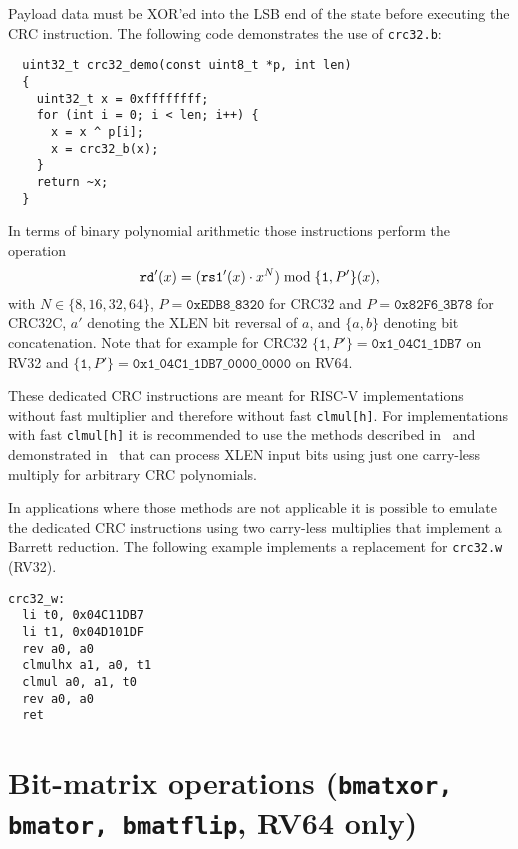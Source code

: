 

Payload data must be XOR'ed into the LSB end of the state before executing the
CRC instruction. The following code demonstrates the use of \texttt{crc32.b}:

\begin{minipage}{\linewidth}
\begin{verbatim}
  uint32_t crc32_demo(const uint8_t *p, int len)
  {
    uint32_t x = 0xffffffff;
    for (int i = 0; i < len; i++) {
      x = x ^ p[i];
      x = crc32_b(x);
    }
    return ~x;
  }
\end{verbatim}
\end{minipage}

In terms of binary polynomial arithmetic those instructions perform the operation
$$ \texttt{rd}'(x) = (\texttt{rs1}'(x) \cdot x^N) \; \textrm{mod} \; \{\texttt{1}, P'\}(x)\textrm, $$
with $N \in \{8, 16, 32, 64\}$,
$P = \texttt{0xEDB8\_8320}$ for CRC32 and $P = \texttt{0x82F6\_3B78}$ for CRC32C,
$a'$ denoting the XLEN bit reversal of $a$,
and $\{a, b\}$ denoting bit concatenation.
Note that for example for CRC32 $\{\texttt{1}, P'\} = \texttt{0x1\_04C1\_1DB7}$
on RV32 and $\{\texttt{1}, P'\} = \texttt{0x1\_04C1\_1DB7\_0000\_0000}$ on RV64.

These dedicated CRC instructions are meant for RISC-V implementations without fast multiplier
and therefore without fast \texttt{clmul[h]}. For implementations with fast \texttt{clmul[h]}
it is recommended to use the methods described in~\cite{FastCRC} and demonstrated in~\cite{Wolf18A}
that can process XLEN input bits using just one carry-less multiply for arbitrary CRC polynomials.

In applications where those methods are not applicable it is possible to emulate the dedicated CRC
instructions using two carry-less multiplies that implement a Barrett reduction. The following example
implements a replacement for \texttt{crc32.w} (RV32).

\begin{minipage}{\linewidth}
\begin{verbatim}
crc32_w:
  li t0, 0x04C11DB7
  li t1, 0x04D101DF
  rev a0, a0
  clmulhx a1, a0, t1
  clmul a0, a1, t0
  rev a0, a0
  ret
\end{verbatim}
\end{minipage}


\section{Bit-matrix operations (\texttt{bmatxor, bmator, bmatflip}, RV64 only)}

